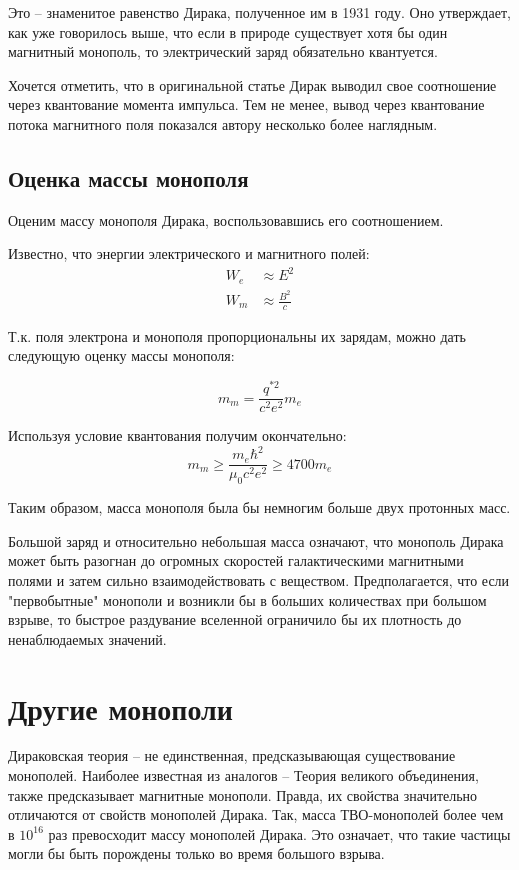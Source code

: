 \documentclass[a4paper, 12pt]{article}
\begin{document}
Это -- знаменитое равенство Дирака, полученное им в 1931 году. Оно утверждает, как уже говорилось выше, что если в природе существует хотя бы один магнитный монополь, то электрический заряд обязательно квантуется.

Хочется отметить, что в оригинальной статье Дирак выводил свое соотношение через квантование момента импульса. Тем не менее, вывод через квантование потока магнитного поля показался автору несколько более наглядным.

\subsection{Оценка массы монополя}
Оценим массу монополя Дирака, воспользовавшись его соотношением. 

Известно, что энергии электрического и магнитного полей:
\begin{align*}
    W_e &\approx E^2 \\
    W_m &\approx \frac{B^2}{c}
\end{align*}

Т.к. поля электрона и монополя пропорциональны их зарядам, можно дать следующую оценку массы монополя:

\[
    m_m = \frac{q^{*2}}{c^2e^2}m_e  
\]

Используя условие квантования получим окончательно:
\[
    m_m \ge \frac{m_e \hbar^2}{\mu_0 c^2 e^2} \ge 4700m_e  
\]

Таким образом, масса монополя была бы немногим больше двух протонных масс. 

Большой заряд и относительно небольшая масса означают, что монополь Дирака может быть разогнан до огромных скоростей галактическими магнитными полями и затем сильно взаимодействовать с веществом. Предполагается, что если "первобытные" монополи и возникли бы в больших количествах при большом взрыве, то быстрое раздувание вселенной ограничило бы их плотность до ненаблюдаемых значений.


\section{Другие монополи}
Дираковская теория -- не единственная, предсказывающая существование монополей. Наиболее известная из аналогов -- Теория великого объединения, также предсказывает магнитные монополи. Правда, их свойства значительно отличаются от свойств монополей Дирака. Так, масса ТВО-монополей более чем в $10^{16}$ раз превосходит массу монополей Дирака. Это означает, что такие частицы могли бы быть порождены только во время большого взрыва.
\end{document}
